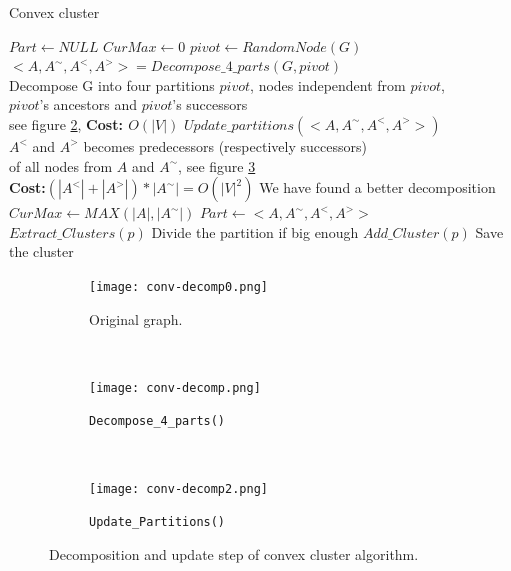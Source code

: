 \documentclass[10pt, conference, compsocconf,pdftex,dvipsnames]{IEEEtran}
\begin{document}
\begin{algorithm}[htb]
    \centering
    \caption{Convex cluster}
    \label{algo:conv-clust}
    \begin{algorithmic}[1]
        \State $Part \gets NULL$
        \State $CurMax \gets 0$
        \label{algop:main-loop}
        \State $pivot \gets RandomNode(G)$
        \State
        $<A,A^{\sim},A^<,A^>>=Decompose\_4\_parts(G,pivot)$\\\label{algop:init-part}
        \Comment Decompose G into four partitions $pivot$, nodes independent from $pivot$,\\ 
        \Comment $pivot$'s ancestors and $pivot$'s successors\\
        \Comment see figure \ref{fig:conv-decomp1}, \textbf{Cost: $O(|V|)$}
        \State $Update\_partitions(<A,A^{\sim},A^<,A^>>)$
        \\\label{algop:update-part}
        \Comment $A^<$ and $A^>$ becomes predecessors  (respectively successors)\\
        \Comment of all nodes from $A$ and $A^{\sim}$, see figure \ref{fig:conv-decomp2} \\
        \Comment \textbf{Cost:$(|A^<| +
        |A^>| )*|A^{\sim}| = O(|V|^2)$}
         \label{algop:part-choice}
        \Comment We have found a better decomposition
        \State $CurMax \gets MAX(|A|,|A^{\sim}|)$
        \State $Part \gets <A,A^{\sim},A^<,A^>>$
        \EndIf
        \EndFor
        \label{algop:rec-stop}
        \State $Extract\_Clusters(p)$
        \Comment Divide the partition if big enough
        \Else
        \State $Add\_Cluster(p)$
        \Comment Save the cluster
        \EndIf
        \EndFor
        \EndFunction
    \end{algorithmic}
\end{algorithm}

\begin{figure}[tb]
    \centering
    \begin{subfigure}{0.24\textwidth}
        \centering
        \texttt{[image: conv-decomp0.png]}
        \caption{Original graph.}
        \label{fig:conv-decomp0}
    \end{subfigure}
    ~
    \begin{subfigure}{0.27\textwidth}
        \centering
        \texttt{[image: conv-decomp.png]}
        \caption{\texttt{Decompose\_4\_parts()}}
        \label{fig:conv-decomp1}
    \end{subfigure}
    ~
    \begin{subfigure}{0.27\textwidth}
        \centering
        \texttt{[image: conv-decomp2.png]}
        \caption{\texttt{Update\_Partitions()}}
        \label{fig:conv-decomp2}
    \end{subfigure}
    \caption{Decomposition and update step of convex cluster algorithm.}
    \label{fig:conv-decomp}
\end{figure}
\end{document}

